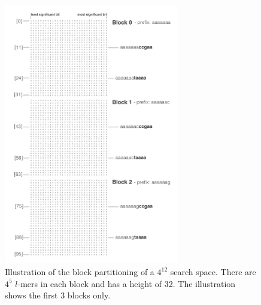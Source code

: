 \begin{figure}[h]
	\centering
	\includegraphics[width=3.0in]{contents/00_images/block_search_space}\vspace*{5pt}
	
	\caption{Illustration of the block partitioning of a $4^{12}$ search space. There are $4^{5}$ $l$-mers in each block and has a height of 32. The illustration shows the first 3 blocks only.}
	\label{fig:block_search_space}
\end{figure}